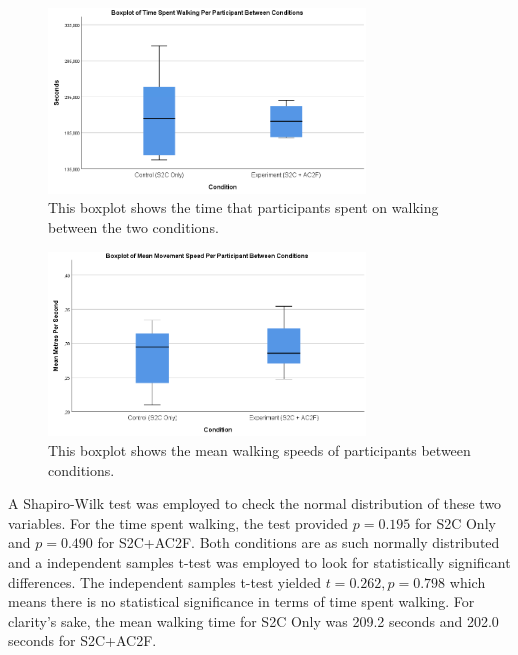 \begin{figure}[tbph]
    \centering
    \includegraphics[width=0.75\textwidth]{figures/graphs/TimeSpentWalkingBetweenConditionsBoxPlot.png}
    \caption[Boxplot of Time Spent Walking Between Conditions in Experiment 2]{This boxplot shows the time that participants spent on walking between the two conditions.}
    \label{fig:TimeSpentWalkingBetweenConditions}
\end{figure}

\begin{figure}[tbph]
    \centering
    \includegraphics[width=0.75\textwidth]{figures/graphs/mpsBoxplot.png}
    \caption[Boxplot of Mean Walking Speed Between Conditions in Experiment 2]{This boxplot shows the mean walking speeds of participants between conditions.}
    \label{fig:ex2mps}
\end{figure}

A Shapiro-Wilk test was employed to check the normal distribution of these two variables. For the time spent walking, the test provided $p = 0.195$ for S2C Only and $p = 0.490$ for S2C+AC2F. Both conditions are as such normally distributed and a independent samples t-test was employed to look for statistically significant differences. The independent samples t-test yielded $t = 0.262, p = 0.798$ which means there is no statistical significance in terms of time spent walking. For clarity's sake, the mean walking time for S2C Only was 209.2 seconds and 202.0 seconds for S2C+AC2F. 

